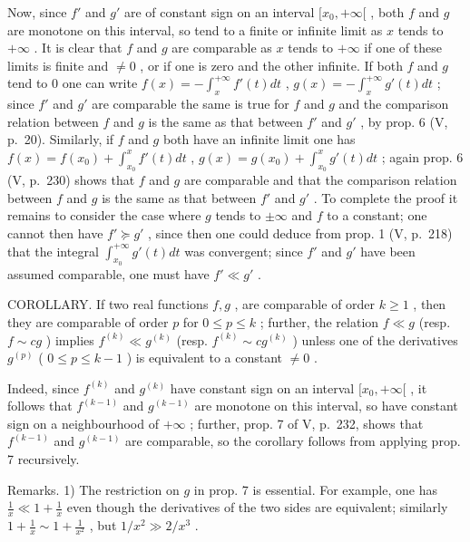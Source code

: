 Now, since \(f'\) and \(g'\) are of constant sign on an interval \([x_0, +\infty[\) , both \(f\) and \(g\) are monotone on this interval, so tend to a finite or infinite limit as \(x\) tends to \(+\infty\) . It is clear that \(f\) and \(g\) are comparable as \(x\) tends to \(+\infty\) if one of these limits is finite and \(\neq 0\) , or if one is zero and the other infinite. If both \(f\) and \(g\) tend to 0 one can write \(f(x) = -\int_x^{+\infty} f'(t) dt\) , \(g(x) = -\int_x^{+\infty} g'(t) dt\) ; since \(f'\) and \(g'\) are comparable the same is true for \(f\) and \(g\) and the comparison relation between \(f\) and \(g\) is the same as that between \(f'\) and \(g'\) , by prop. 6 (V, p.~20). Similarly, if \(f\) and \(g\) both have an infinite limit one has \(f(x) = f(x_0) + \int_{x_0}^x f'(t) dt\) , \(g(x) = g(x_0) + \int_{x_0}^x g'(t) dt\) ; again prop. 6 (V, p.~230) shows that \(f\) and \(g\) are comparable and that the comparison relation between \(f\) and \(g\) is the same as that between \(f'\) and \(g'\) . To complete the proof it remains to consider the case where \(g\) tends to \(\pm \infty\) and \(f\) to a constant; one cannot then have \(f' \succcurlyeq g'\) , since then one could deduce from prop. 1 (V, p.~218) that the integral \(\int_{x_0}^{+\infty} g'(t) dt\) was convergent; since \(f'\) and \(g'\) have been assumed comparable, one must have \(f' \ll g'\) .

COROLLARY. If two real functions \(f, g\) , are comparable of order \(k \geqslant 1\) , then they are comparable of order \(p\) for \(0 \leqslant p \leqslant k\) ; further, the relation \(f \ll g\) (resp. \(f \sim cg\) ) implies \(f^{(k)} \ll g^{(k)}\) (resp. \(f^{(k)} \sim cg^{(k)}\) ) unless one of the derivatives \(g^{(p)}\) ( \(0 \leqslant p \leqslant k - 1\) ) is equivalent to a constant \(\neq 0\) .

Indeed, since \(f^{(k)}\) and \(g^{(k)}\) have constant sign on an interval \([x_0, +\infty[\) , it follows that \(f^{(k-1)}\) and \(g^{(k-1)}\) are monotone on this interval, so have constant sign on a neighbourhood of \(+\infty\) ; further, prop. 7 of V, p.~232, shows that \(f^{(k-1)}\) and \(g^{(k-1)}\) are comparable, so the corollary follows from applying prop. 7 recursively.

Remarks. 1) The restriction on \(g\) in prop. 7 is essential. For example, one has \(\frac{1}{x} \ll 1 + \frac{1}{x}\) even though the derivatives of the two sides are equivalent; similarly \(1 + \frac{1}{x} \sim 1 + \frac{1}{x^2}\) , but \(1 / x^2 \gg 2 / x^3\) .

